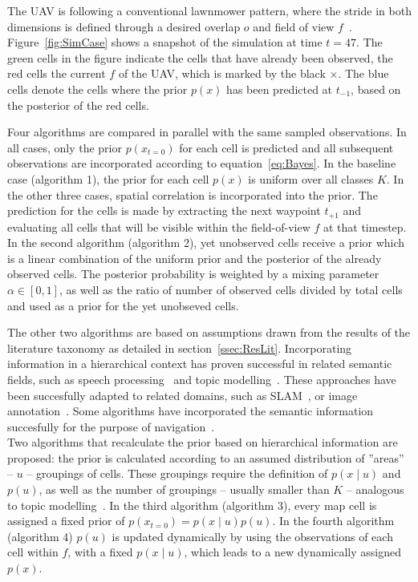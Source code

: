 \documentclass[twocolumn,letterpaper]{IEEEAerospaceCLS}  %
\begin{document}
The UAV is following a conventional lawnmower pattern, where the stride in both dimensions is defined through a desired overlap $o$ and field of view $f$~\cite{shetty_implementation_2020}. Figure~\ref{fig:SimCase} shows a snapshot of the simulation at time $t=47$. The green cells in the figure indicate the cells that have already been observed, the red cells the current $f$ of the UAV, which is marked by the black $\pmb{\times}$. The blue cells denote the cells where the prior $p(x)$ has been predicted at $t_{-1}$, based on the posterior of the red cells.

Four algorithms are compared in parallel with the same sampled observations. In all cases, only the prior $p(x_{t=0})$ for each cell is predicted and all subsequent observations are incorporated according to equation~\ref{eq:Bayes}. In the baseline case (algorithm 1), the prior for each cell $p(x)$ is uniform over all classes $K$. In the other three cases, spatial correlation is incorporated into the prior. The prediction for the cells is made by extracting the next waypoint $t_{+1}$ and evaluating all cells that will be visible within the field-of-view $f$ at that timestep. In the second algorithm (algorithm 2), yet unobserved cells receive a prior which is a linear combination of the uniform prior and the posterior of the already observed cells. The posterior probability is weighted by a mixing parameter $\alpha \in [0, 1]$, as well as the ratio of number of observed cells divided by total cells and used as a prior for the yet unobseved cells.

The other two algorithms are based on assumptions drawn from the results of the literature taxonomy as detailed in section~\ref{ssec:ResLit}. Incorporating information in a hierarchical context has proven successful in related semantic fields, such as speech processing~\cite{fine_hierarchical_1998} and topic modelling~\cite{blei_latent_2003}. These approaches have been succesfully adapted to related domains, such as SLAM~\cite{zhang_hierarchical_2019}, or image annotation~\cite{fei-fei_bayesian_2005,lienou_semantic_2010}. Some algorithms have incorporated the semantic information succesfully for the purpose of navigation~\cite{koch_automatic_2019,chaplot_object_2020,wu_learning_2018,alirezaie_exploiting_2017}.\\
Two algorithms  that recalculate the prior based on hierarchical information are proposed: the prior is calculated according to an assumed distribution of ''areas'' -- $u$ -- groupings of cells. These groupings require the definition of $p(x\mid u)$ and $p(u)$, as well as the number of groupings -- usually smaller than $K$ -- analogous to topic modelling~\cite{blei_latent_2003}. In the third algorithm (algorithm 3), every map cell is assigned a fixed prior of $p(x_{t=0}) = p(x\mid u) p(u)$. In the fourth algorithm (algorithm 4) $p(u)$ is updated dynamically by using the observations of each cell within $f$, with a fixed $p(x\mid u)$, which leads to a new dynamically assigned $p(x)$.
\end{document}
